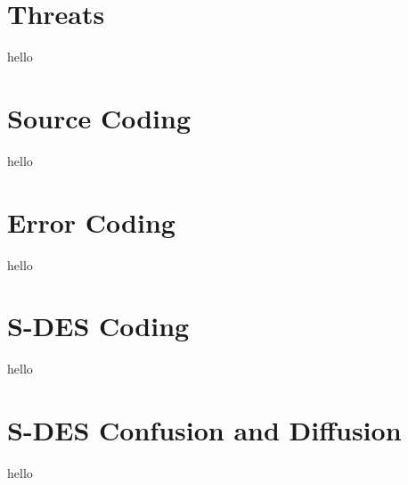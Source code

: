 \documentclass[]{article}
\begin{document}
\section*{Threats}

hello \\

\section*{Source Coding}

hello \\

\section*{Error Coding}

hello \\

\section*{S-DES Coding}

hello \\

\section*{S-DES Confusion and Diffusion}

hello \\

\break

\end{document}
